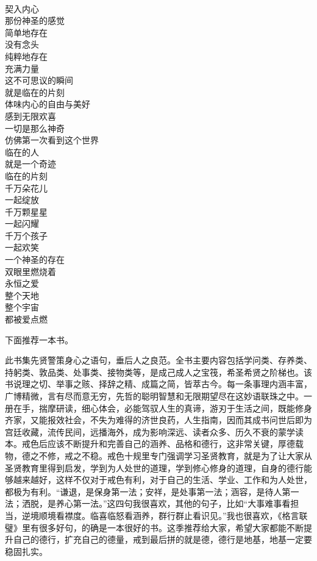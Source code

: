 \begin{poem}[神圣的临在]
    \begin{multicols}{3}
        \centering~\\
        契入内心 \\ 那份神圣的感觉 \\ 简单地存在 \\ 没有念头 \\ 纯粹地存在 \\ 充满力量 \\ 这不可思议的瞬间 \\ 就是临在的片刻 \\ 体味内心的自由与美好 \\ 感到无限欢喜 \\ 一切是那么神奇 \\ 仿佛第一次看到这个世界 \\ 临在的人 \\ 就是一个奇迹 \\ 临在的片刻 \\ 千万朵花儿 \\ 一起绽放 \\ 千万颗星星 \\ 一起闪耀 \\ 千万个孩子 \\ 一起欢笑 \\ 一个神圣的存在 \\ 双眼里燃烧着 \\ 永恒之爱 \\ 整个天地 \\ 整个宇宙 \\ 都被爱点燃
    \end{multicols}
\end{poem}

下面推荐一本书。

\begin{book}[《格言联璧》]
    此书集先贤警策身心之语句，垂后人之良范。全书主要内容包括学问类、存养类、持躬类、敦品类、处事类、接物类等，是成己成人之宝筏，希圣希贤之阶梯也。该书说理之切、举事之赅、择辞之精、成篇之简，皆萃古今。每一条事理内涵丰富，广博精微，言有尽而意无穷，先哲的聪明智慧和无限期望尽在这妙语联珠之中。一册在手，揣摩研读，细心体会，必能驾驭人生的真谛，游刃于生活之间，既能修身齐家，又能报效社会，不失为难得的济世良药，人生指南，因而其成书问世后即为宫廷收藏，流传民间，远播海外，成为影响深远、读者众多、历久不衰的蒙学读本。戒色后应该不断提升和完善自己的涵养、品格和德行，这非常关键，厚德载物，德之不修，戒之不稳。戒色十规里专门强调学习圣贤教育，就是为了让大家从圣贤教育里得到启发，学到为人处世的道理，学到修心修身的道理，自身的德行能够越来越好，这样不仅对于戒色有利，对于自己的生活、学业、工作和为人处世，都极为有利。“谦退，是保身第一法；安祥，是处事第一法；涵容，是待人第一法；洒脱，是养心第一法。”这四句我很喜欢，其他的句子，比如“大事难事看担当，逆境顺境看襟度。临喜临怒看涵养，群行群止看识见。”我也很喜欢，《格言联璧》里有很多好句，的确是一本很好的书。这季推荐给大家，希望大家都能不断提升自己的德行，扩充自己的德量，戒到最后拼的就是德，德行是地基，地基一定要稳固扎实。
\end{book}
